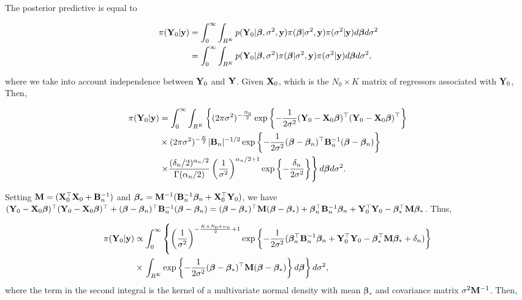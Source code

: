 The posterior predictive is equal to

\begin{align*}
	\pi({\bf{Y}}_0|{\bf{y}})&=\int_{0}^{\infty}\int_{R^K}p({\bf{Y}}_0|\bm{\beta},\sigma^2,{\bf{y}})\pi(\bm{\beta}|\sigma^2,{\bf{y}})\pi(\sigma^2|{\bf{y}})d\bm{\beta} d\sigma^2\\
	&=\int_{0}^{\infty}\int_{R^K}p({\bf{Y}}_0|\bm{\beta},\sigma^2)\pi(\bm{\beta}|\sigma^2,{\bf{y}})\pi(\sigma^2|{\bf{y}})d\bm{\beta} d\sigma^2,
\end{align*}

where we take into account independence between ${\bf{Y}}_0$ and ${\bf{Y}}$. Given ${\bf{X}}_0$, which is the $N_0\times K$ matrix of regressors associated with ${\bf{Y}}_0$, Then,

\begin{align*}
	\pi({\bf{Y}}_0|{\bf{y}})&=\int_{0}^{\infty}\int_{R^K}\left\{ (2\pi\sigma^2)^{-\frac{N_0}{2}} \exp \left\{-\frac{1}{2\sigma^2} ({\bf{Y}}_0 - {\bf{X}}_0\bm{\beta})^{\top}({\bf{Y}}_0 - {\bf{X}}_0\bm{\beta})^{\top} \right\}\right. \\
	& \times (2\pi\sigma^2)^{-\frac{K}{2}} |{\bf{B}}_n|^{-1/2} \exp \left\{-\frac{1}{2\sigma^2} (\bm{\beta} - \bm{\beta}_n)^{\top}{\bf{B}}_n^{-1}(\bm{\beta} - \bm{\beta}_n)\right\} \\
	& \left. \times \frac{(\delta_n/2)^{\alpha_n/2}}{\Gamma(\alpha_n/2)}\left(\frac{1}{\sigma^2}\right)^{\alpha_n/2+1}\exp \left\{-\frac{\delta_n}{2\sigma^2} \right\}\right\}d\bm{\beta} d\sigma^2. \\
\end{align*}

Setting ${\bf{M}}=({\bf{X}}_0^{\top}{\bf{X}}_0+{\bf{B}}_n^{-1})$ and $\bm{\beta}_*={\bf{M}}^{-1}({\bf{B}}_n^{-1}\bm{\beta}_n+{\bf{X}}_0^{\top}{\bf{Y}}_0)$, we have
$({\bf{Y}}_0 - {\bf{X}}_0\bm{\beta})^{\top}({\bf{Y}}_0 - {\bf{X}}_0\bm{\beta})^{\top}+(\bm{\beta} - \bm{\beta}_n)^{\top}{\bf{B}}_n^{-1}(\bm{\beta} - \bm{\beta}_n)=(\bm{\beta} - \bm{\beta}_*)^{\top}{\bf{M}}(\bm{\beta} - \bm{\beta}_*)+\bm{\beta}_n^{\top}{\bf{B}}_n^{-1}\bm{\beta}_n+{\bf{Y}}_0^{\top}{\bf{Y}}_0-\bm{\beta}_*^{\top}{\bf{M}}\bm{\beta}_*$.
Thus, 

{\footnotesize{
\begin{align*}
	\pi({\bf{Y}}_0|{\bf{y}})&\propto\int_{0}^{\infty}\left\{\left(\frac{1}{\sigma^2}\right)^{-\frac{K+N_0+\alpha_n}{2}+1}\exp\left\{-\frac{1}{2\sigma^2}(\bm{\beta}_n^{\top}{\bf{B}}_n^{-1}\bm{\beta}_n+{\bf{Y}}_0^{\top}{\bf{Y}}_0-\bm{\beta}_*^{\top}{\bf{M}}\bm{\beta}_*+\delta_n)\right\}\right.\\
	&\times\left.\int_{R^K}\exp\left\{-\frac{1}{2\sigma^2}(\bm{\beta} - \bm{\beta}_*)^{\top}{\bf{M}}(\bm{\beta} - \bm{\beta}_*)\right\}d\bm{\beta}\right\} d\sigma^2,\\
\end{align*}
}}
where the term in the second integral is the kernel of a multivariate normal density with mean $\bm{\beta}_*$ and covariance matrix $\sigma^2{\bf{M}}^{-1}$. Then,

